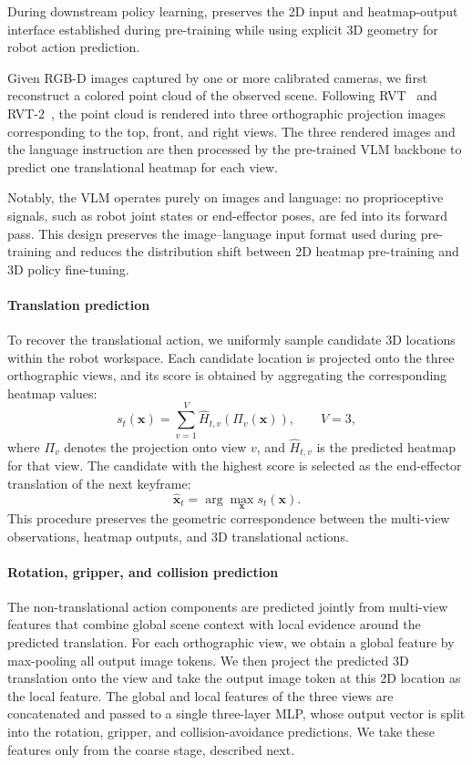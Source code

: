 During downstream policy learning, \method preserves the 2D input and
heatmap-output interface established during pre-training while using
explicit 3D geometry for robot action prediction.

Given RGB-D images captured by one or more calibrated cameras, we first
reconstruct a colored point cloud of the observed scene.
Following RVT~\cite{goyal2023rvt} and
RVT-2~\cite{goyal2024rvt}, the point cloud is rendered into three
orthographic projection images corresponding to the top, front, and right
views.
The three rendered images and the language instruction are then processed
by the pre-trained VLM backbone to predict one translational heatmap for
each view.

Notably, the VLM operates purely on images and language: no proprioceptive
signals, such as robot joint states or end-effector poses, are fed into its
forward pass.
This design preserves the image--language input format used during
pre-training and reduces the distribution shift between 2D heatmap
pre-training and 3D policy fine-tuning.

\paragraph{Translation prediction}
To recover the translational action, we uniformly sample candidate 3D
locations within the robot workspace.
Each candidate location is projected onto the three orthographic views, and
its score is obtained by aggregating the corresponding heatmap values:
\begin{equation}
s_t(\mathbf{x})
=
\sum_{v=1}^{V}
\widehat{H}_{t,v}
\left(
\Pi_v(\mathbf{x})
\right),
\qquad V=3,
\label{eq:translation_score}
\end{equation}
where $\Pi_v$ denotes the projection onto view $v$, and
$\widehat{H}_{t,v}$ is the predicted heatmap for that view.
The candidate with the highest score is selected as the end-effector
translation of the next keyframe:
\begin{equation}
\widehat{\mathbf{x}}_t
=
\arg\max_{\mathbf{x}}
s_t(\mathbf{x}).
\label{eq:translation_prediction}
\end{equation}
This procedure preserves the geometric correspondence between the
multi-view observations, heatmap outputs, and 3D translational actions.

\paragraph{Rotation, gripper, and collision prediction}
The non-translational action components are predicted jointly from
multi-view features that combine global scene context with local evidence
around the predicted translation.
For each orthographic view, we obtain a global feature by max-pooling all
output image tokens.
We then project the predicted 3D translation onto the view and take the
output image token at this 2D location as the local feature.
The global and local features of the three views are concatenated and passed
to a single three-layer MLP, whose output vector is split into the rotation,
gripper, and collision-avoidance predictions.
We take these features only from the coarse stage, described next.

